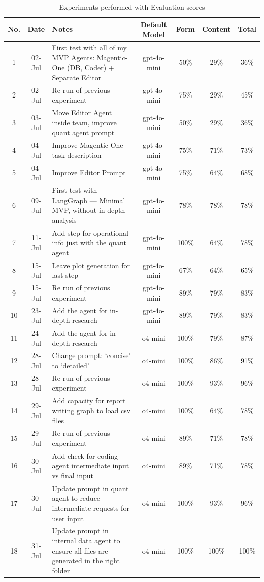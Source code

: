 \documentclass[a4paper]{report}
\begin{document}
\begin{table}[H]
\centering
\begin{tabular}{|c|c|p{7cm}|c|c|c|c|}
    \hline
    No. & Date & Notes & Default Model & Form & Content & Total \\ \hline
    1 & 02-Jul & First test with all of my MVP Agents: Magentic-One (DB, Coder) + Separate Editor & gpt-4o-mini & 50\% & 29\% & 36\% \\ \hline
    2 & 02-Jul & Re run of previous experiment & gpt-4o-mini & 75\% & 29\% & 45\% \\ \hline
    3 & 03-Jul & Move Editor Agent inside team, improve quant agent prompt & gpt-4o-mini & 50\% & 29\% & 36\% \\ \hline
    4 & 04-Jul & Improve Magentic-One task description & gpt-4o-mini & 75\% & 71\% & 73\% \\ \hline
    5 & 04-Jul & Improve Editor Prompt & gpt-4o-mini & 75\% & 64\% & 68\% \\ \hline
    6 & 09-Jul & First test with LangGraph --- Minimal MVP, without in-depth analysis & gpt-4o-mini & 78\% & 78\% & 78\% \\ \hline
    7 & 11-Jul & Add step for operational info just with the quant agent & gpt-4o-mini & 100\% & 64\% & 78\% \\ \hline
    8 & 15-Jul & Leave plot generation for last step & gpt-4o-mini & 67\% & 64\% & 65\% \\ \hline
    9 & 15-Jul & Re run of previous experiment  & gpt-4o-mini & 89\% & 79\% & 83\% \\ \hline
    10 & 23-Jul & Add the agent for in-depth research & gpt-4o-mini & 89\% & 79\% & 83\% \\ \hline
    11 & 24-Jul & Add the agent for in-depth research & o4-mini & 100\% & 79\% & 87\% \\ \hline
    12 & 28-Jul & Change prompt: `concise' to `detailed' & o4-mini & 100\% & 86\% & 91\% \\ \hline
    13 & 28-Jul & Re run of previous experiment & o4-mini & 100\% & 93\% & 96\% \\ \hline
    14 & 29-Jul & Add capacity for report writing graph to load csv files & o4-mini & 100\% & 64\% & 78\% \\ \hline
    15 & 29-Jul & Re run of previous experiment & o4-mini & 89\% & 71\% & 78\% \\ \hline
    16 & 30-Jul & Add check for coding agent intermediate input vs final input & o4-mini & 89\% & 71\% & 78\% \\ \hline
    17 & 30-Jul & Update prompt in quant agent to reduce intermediate requests for user input & o4-mini & 100\% & 93\% & 96\% \\ \hline
    18 & 31-Jul & Update prompt in internal data agent to ensure all files are generated in the right folder & o4-mini & 100\% & 100\% & 100\% \\ \hline
    \end{tabular}
\caption{Experiments performed with Evaluation scores}
\end{table}
\end{document}
